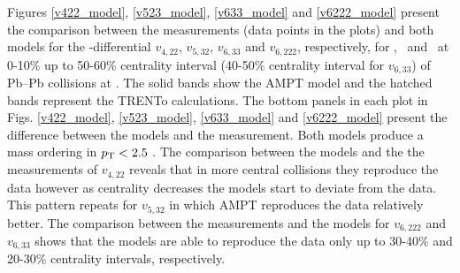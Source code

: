 \documentclass[ALICE,manyauthors]{cernphprep}
\providecommand{\DIFaddbegin}{} %
\providecommand{\DIFaddend}{} %
\begin{document}
\DIFaddbegin 


\DIFaddend Figures \ref{v422_model}, \ref{v523_model}, \ref{v633_model} and \ref{v6222_model} present the comparison between the measurements (data points in the plots) and both models for the \pT-differential $v_{4,22}$, $v_{5,32}$, $v_{6,33}$ and $v_{6,222}$, respectively, for \pion, \kaon~and \proton~at 0-10\% up to 50-60\% centrality interval (40-50\% centrality interval for $v_{6,33}$) of Pb--Pb collisions at \sNN. The solid bands show the AMPT model and the hatched bands represent the TRENTo calculations. The bottom panels in each plot in Figs. \ref{v422_model}, \ref{v523_model}, \ref{v633_model} and \ref{v6222_model} present the difference between the models and the measurement. Both models produce a mass ordering in $p_{\rm{T}}<2.5$ \GeV. The comparison between the models and the the measurements of $v_{4,22}$ reveals that in more central collisions they reproduce the data however as centrality decreases the models start to deviate from the data. This pattern repeats for $v_{5,32}$ in which AMPT reproduces the data relatively better. The comparison between the measurements and the models  for $v_{6,222}$ and $v_{6,33}$ shows that the models are able to reproduce the data only up to 30-40\% and 20-30\% centrality intervals, respectively. 
\end{document}
